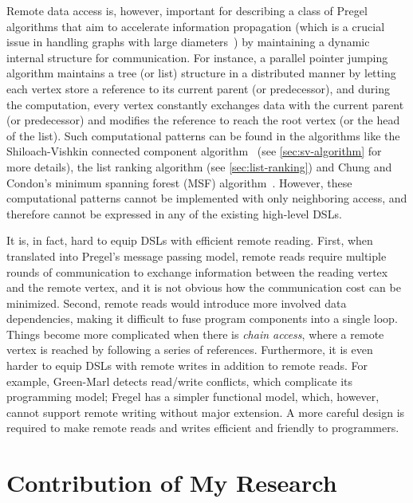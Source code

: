 \documentclass{sokendai_thesis} %
\begin{document}
Remote data access is, however, important for describing a class of Pregel algorithms that aim to accelerate information propagation (which is a crucial issue in handling graphs with large diameters~\cite{connectivity}) by maintaining a dynamic internal structure for communication.
For instance, a parallel pointer jumping algorithm maintains a tree (or list) structure in a distributed manner by letting each vertex store a reference to its current parent (or predecessor), and during the computation, every vertex constantly exchanges data with the current parent (or predecessor) and modifies the reference to reach the root vertex (or the head of the list).
Such computational patterns can be found in the algorithms like the Shiloach-Vishkin connected component algorithm~\cite{connectivity} (see \autoref{sec:sv-algorithm} for more details), the list ranking algorithm (see \autoref{sec:list-ranking}) and Chung and Condon's minimum spanning forest (MSF) algorithm~\cite{boruvka}.
However, these computational patterns cannot be implemented with only neighboring access, and therefore cannot be expressed in any of the existing high-level DSLs.

It is, in fact, hard to equip DSLs with efficient remote reading.
First, when translated into Pregel's message passing model, remote reads require multiple rounds of communication to exchange information between the reading vertex and the remote vertex, and it is not obvious how the communication cost can be minimized.
Second, remote reads would introduce more involved data dependencies, making it difficult to fuse program components into a single loop.
Things become more complicated when there is \emph{chain access}, where a remote vertex is reached by following a series of references.
Furthermore, it is even harder to equip DSLs with remote writes in addition to remote reads.
For example, Green-Marl detects read/write conflicts, which complicate its programming model; Fregel has a simpler functional model, which, however, cannot support remote writing without major extension.
A more careful design is required to make remote reads and writes efficient and friendly to programmers.

\section{Contribution of My Research}
\end{document}
